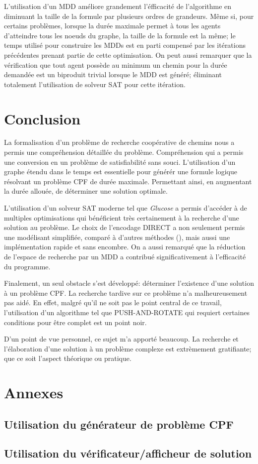 \documentclass[french, 12pt, letterpaper]{article}
\theoremstyle{definition}
\theoremstyle{proposition}
\theoremstyle{example}
\begin{document}
    L'utilisation d'un MDD améliore grandement l'éfficacité de l'algorithme en diminuant la taille de la formule par plusieurs
    ordres de grandeurs. Même si, pour certains problèmes, lorsque la durée maximale permet à tous les agents d'atteindre tous les noeuds
    du graphe, la taille de la formule est la même; le temps utilisé pour construire les MDDs est en parti compensé par les itérations précédentes
    prenant partie de cette optimisation. On peut aussi remarquer que la vérification que tout agent possède au minimum un chemin pour 
    la durée demandée est un biproduit trivial lorsque le MDD est généré; éliminant totalement l'utilisation de solveur SAT pour cette itération. 

    \newpage
    \section*{Conclusion}

    La formalisation d'un problème de recherche coopérative de chemins nous a permis une compréhension détaillée du problème.
    Compréhension qui a permis une conversion en un problème de satisfiabilité sans souci. L'utilisation d'un graphe étendu dans
    le temps est essentielle pour générér une formule logique résolvant un problème CPF de durée maximale. 
    Permettant ainsi, en augmentant la durée allouée, de déterminer une solution optimale.

    L'utilisation d'un solveur SAT moderne tel que \emph{Glucose} a permis d'accéder à de multiples optimisations qui bénéficient très certainement
    à la recherche d'une solution au problème. Le choix de l'encodage DIRECT a non seulement permis une modélisant simplifiée, comparé à d'autres
    méthodes (\cite{PSUR16}), mais aussi une implémentation rapide et sans encombre. On a aussi remarqué que la réduction de l'espace
    de recherche par un MDD a contribué significativement à l'efficacité du programme.

    Finalement, un seul obstacle s'est développé: déterminer l'existence d'une solution à un problème CPF. La recherche tardive sur ce problème
    n'a malheureusement pas aidé. En effet, malgré qu'il ne soit pas le point central de ce travail, l'utilisation d'un algorithme tel que
    PUSH-AND-ROTATE \cite{WILDEPAR} qui requiert certaines conditions pour être complet est un point noir. 

    D'un point de vue personnel, ce sujet m'a apporté beaucoup. La recherche et l'élaboration d'une solution à un problème complexe est 
    extrèmement gratifiante; que ce soit l'aspect théorique ou pratique.

    
    \newpage
    

    \section*{Annexes}

    \subsection*{Utilisation du générateur de problème CPF}
    \label{anx:generator}
    \subsection*{Utilisation du vérificateur/afficheur de solution}
    \label{anx:verifier}
\end{document}
